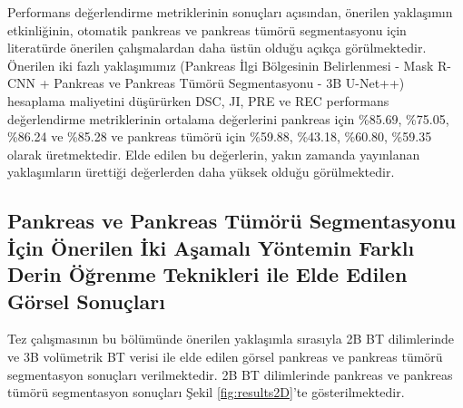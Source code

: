 Performans değerlendirme metriklerinin sonuçları açısından, önerilen yaklaşımın etkinliğinin, otomatik pankreas ve pankreas tümörü segmentasyonu için literatürde önerilen çalışmalardan daha üstün olduğu açıkça görülmektedir. Önerilen iki fazlı yaklaşımımız (Pankreas İlgi Bölgesinin Belirlenmesi - Mask R-CNN + Pankreas ve Pankreas Tümörü Segmentasyonu - 3B U-Net++) hesaplama maliyetini düşürürken DSC, JI, PRE ve REC performans değerlendirme metriklerinin ortalama değerlerini pankreas için \%85.69, \%75.05, \%86.24 ve \%85.28 ve pankreas tümörü için \%59.88, \%43.18, \%60.80, \%59.35 olarak üretmektedir. Elde edilen bu değerlerin, yakın zamanda yayınlanan yaklaşımların ürettiği değerlerden daha yüksek olduğu görülmektedir.

\subsection{Pankreas ve Pankreas Tümörü Segmentasyonu İçin Önerilen İki Aşamalı Yöntemin Farklı Derin Öğrenme Teknikleri ile Elde Edilen Görsel Sonuçları}

Tez çalışmasının bu bölümünde önerilen yaklaşımla sırasıyla 2B BT dilimlerinde ve 3B  volümetrik BT verisi ile elde edilen görsel pankreas ve pankreas tümörü segmentasyon sonuçları verilmektedir. 2B BT dilimlerinde pankreas ve pankreas tümörü segmentasyon sonuçları Şekil \ref{fig:results2D}'te gösterilmektedir. 

